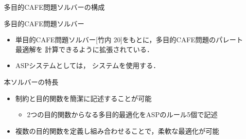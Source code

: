 \documentclass[dvipdfmx, 11pt]{beamer}
\begin{document}
\begin{frame}{多目的CAFE問題ソルバーの構成}
 \scalebox{0.9}{\centering}
    \begin{block}{多目的CAFE問題ソルバー}
     \begin{itemize}
      \item 単目的CAFE問題ソルバー[竹内 20]をもとに，多目的CAFE問題のパレート最適解を
      計算できるように拡張されている．
      \item ASPシステムとしては，{\asprin} システムを使用する．
     \end{itemize}
    \end{block}
 \begin{alertblock}{本ソルバーの特長}
  \begin{itemize}
   \item 制約と目的関数を簡潔に記述することが可能
	 \begin{itemize}
	  \item 2つの目的関数からなる多目的最適化をASPのルール5個で記述
	 \end{itemize}
   \item 複数の目的関数を定義し組み合わせることで，柔軟な最適化が可能
  \end{itemize}
 \end{alertblock}
\end{frame}
\end{document}
